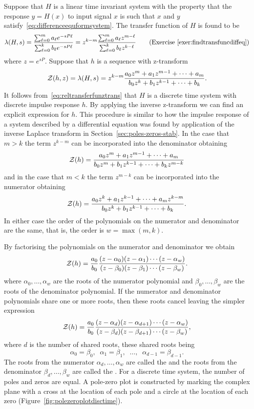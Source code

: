 Suppose that $H$ is a linear time invariant system with the property that the response $y = H(x)$ to input signal $x$ is such that $x$ and $y$ satisfy~\eqref{eq:differenceequformsystem}.  The transfer function of $H$ is found to be
\[
\lambda(H,s) = \frac{\sum_{\ell=0}^{m} a_\ell e^{-sP\ell}}{\sum_{\ell=0}^{k} b_\ell e^{-sP\ell}} = z^{k-m} \frac{\sum_{\ell=0}^{m} a_\ell z^{m-\ell}}{\sum_{\ell=0}^{k} b_\ell z^{k-\ell}} \qquad \text{(Exercise~\ref{exer:findtransfuncdiffeq})}
\]
where $z = e^{sP}$.  Suppose that $h$ is a sequence with z-transform
\[
{\mathcal Z}(h,z) = \lambda(H,s) = z^{k-m}\frac{a_0z^m + a_1 z^{m-1} + \dots + a_m}{b_0z^k + b_1 z^{k-1} + \dots + b_k}.
\]
It follows from~\eqref{eq:reltransferfunztrans} that $H$ is a discrete time system with discrete impulse response $h$.  By applying the inverse z-transform we can find an explicit expression for $h$.  This procedure is similar to how the impulse response of a system described by a differential equation was found by application of the inverse Laplace transform in Section~\ref{sec:poles-zeros-stab}.  In the case that $m > k$ the term $z^{k-m}$ can be incorporated into the denominator obtaining
\[
{\mathcal Z}(h) = \frac{a_0z^m + a_1 z^{m-1} + \dots + a_m}{b_0z^m + b_1 z^{k-1} + \dots + b_k z^{m-k}}
\]
and in the case that $m < k$ the term $z^{m-k}$ can be incorporated into the numerator obtaining
\[
{\mathcal Z}(h) = \frac{a_0z^k + a_1 z^{k-1} + \dots + a_m z^{k-m}}{b_0z^k + b_1 z^{k-1} + \dots + b_k}.
\] 
In either case the order of the polynomials on the numerator and denominator are the same, that is, the order is $w = \max(m,k)$.

By factorising the polynomials on the numerator and denominator we obtain
\[
{\mathcal Z}(h) = \frac{a_0}{b_0} \frac{(z-\alpha_0)(z - \alpha_1)\cdots(z - \alpha_{w})}{(z-\beta_0)(z - \beta_1)\cdots(z - \beta_{w})}.
\]
where $\alpha_0, \dots, \alpha_w$ are the roots of the numerator polynomial and $\beta_0, \dots, \beta_w$ are the roots of the denominator polynomial.  If the numerator and denominator polynomials share one or more roots, then these roots cancel leaving the simpler expression
\begin{equation}\label{eq:ztransfuncpoleszeros}
{\mathcal Z}(h) = \frac{a_0}{b_0} \frac{(z-\alpha_d)(z - \alpha_{d+1})\cdots(z - \alpha_{w})}{(z-\beta_d)(z - \beta_{d+1})\cdots(z - \beta_{w})},
\end{equation}
where $d$ is the number of shared roots, these shared roots being 
\[
\alpha_0 = \beta_0, \;\; \alpha_1 = \beta_1, \;\; \dots, \;\;  \alpha_{d-1} = \beta_{d-1}.
\]
The roots from the numerator $\alpha_d, \dots, \alpha_w$ are called the  and the roots from the denominator $\beta_d, \dots, \beta_w$ are called the .  For a discrete time system, the number of poles and zeros are equal.   A pole-zero plot is constructed by marking the complex plane with a cross at the location of each pole and a circle at the location of each zero (Figure~\ref{fig:polezeroplotdisctime}). %

